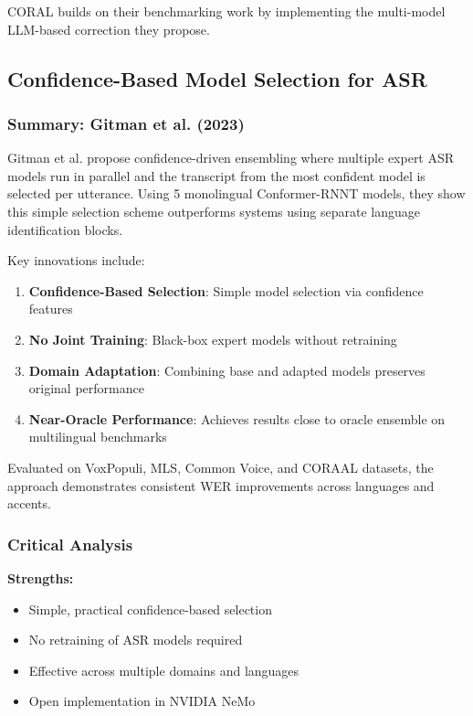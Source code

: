 CORAL builds on their benchmarking work by implementing the multi-model LLM-based correction they propose.

\subsection{Confidence-Based Model Selection for ASR}

\subsubsection{Summary: Gitman et al. (2023)}

Gitman et al. \cite{gitman2023} propose confidence-driven ensembling where multiple expert ASR models run in parallel and the transcript from the most confident model is selected per utterance. Using 5 monolingual Conformer-RNNT models, they show this simple selection scheme outperforms systems using separate language identification blocks.

Key innovations include:

\begin{enumerate}[topsep=6pt,itemsep=3pt]
    \item \textbf{Confidence-Based Selection}: Simple model selection via confidence features
    \item \textbf{No Joint Training}: Black-box expert models without retraining
    \item \textbf{Domain Adaptation}: Combining base and adapted models preserves original performance
    \item \textbf{Near-Oracle Performance}: Achieves results close to oracle ensemble on multilingual benchmarks
\end{enumerate}

Evaluated on VoxPopuli, MLS, Common Voice, and CORAAL datasets, the approach demonstrates consistent WER improvements across languages and accents.

\subsubsection{Critical Analysis}

\textbf{Strengths:}
\begin{itemize}[topsep=4pt,itemsep=2pt]
    \item Simple, practical confidence-based selection
    \item No retraining of ASR models required
    \item Effective across multiple domains and languages
    \item Open implementation in NVIDIA NeMo
\end{itemize}

